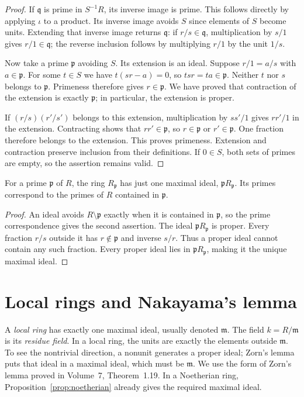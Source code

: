 \begin{proof}
If $\mathfrak q$ is prime in $S^{-1}R$, its inverse image is prime. This follows directly by applying $\iota$ to a product. Its inverse image avoids $S$ since elements of $S$ become units. Extending that inverse image returns $\mathfrak q$: if $r/s\in\mathfrak q$, multiplication by $s/1$ gives $r/1\in\mathfrak q$; the reverse inclusion follows by multiplying $r/1$ by the unit $1/s$.

Now take a prime $\mathfrak p$ avoiding $S$. Its extension is an ideal. Suppose $r/1=a/s$ with $a\in\mathfrak p$. For some $t\in S$ we have $t(sr-a)=0$, so $tsr=ta\in\mathfrak p$. Neither $t$ nor $s$ belongs to $\mathfrak p$. Primeness therefore gives $r\in\mathfrak p$. We have proved that contraction of the extension is exactly $\mathfrak p$; in particular, the extension is proper.

If $(r/s)(r'/s')$ belongs to this extension, multiplication by $ss'/1$ gives $rr'/1$ in the extension. Contracting shows that $rr'\in\mathfrak p$, so $r\in\mathfrak p$ or $r'\in\mathfrak p$. One fraction therefore belongs to the extension. This proves primeness. Extension and contraction preserve inclusion from their definitions. If $0\in S$, both sets of primes are empty, so the assertion remains valid.
\end{proof}

\begin{corollary}\label{cor:localring}
For a prime $\mathfrak p$ of $R$, the ring $R_{\mathfrak p}$ has just one maximal ideal, $\mathfrak pR_{\mathfrak p}$. Its primes correspond to the primes of $R$ contained in $\mathfrak p$.
\end{corollary}

\begin{proof}
An ideal avoids $R\setminus\mathfrak p$ exactly when it is contained in $\mathfrak p$, so the prime correspondence gives the second assertion. The ideal $\mathfrak pR_{\mathfrak p}$ is proper. Every fraction $r/s$ outside it has $r\notin\mathfrak p$ and inverse $s/r$. Thus a proper ideal cannot contain any such fraction. Every proper ideal lies in $\mathfrak pR_{\mathfrak p}$, making it the unique maximal ideal.
\end{proof}

\section{Local rings and Nakayama's lemma}

A \emph{local ring} has exactly one maximal ideal, usually denoted $\mathfrak m$. The field $k=R/\mathfrak m$ is its \emph{residue field}. In a local ring, the units are exactly the elements outside $\mathfrak m$. To see the nontrivial direction, a nonunit generates a proper ideal; Zorn's lemma puts that ideal in a maximal ideal, which must be $\mathfrak m$. We use the form of Zorn's lemma proved in Volume~7, Theorem~1.19. In a Noetherian ring, Proposition~\ref{prop:noetherian} already gives the required maximal ideal.

